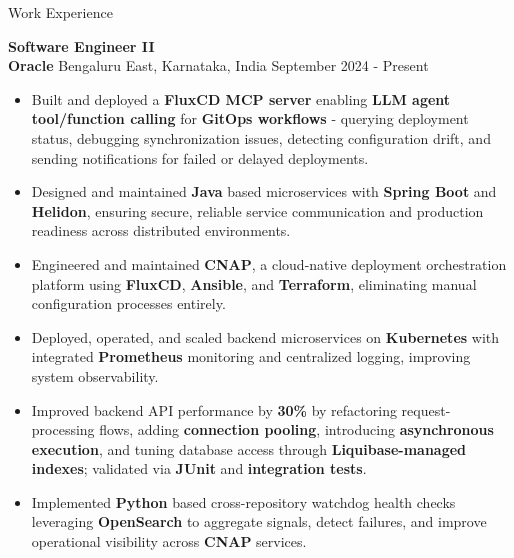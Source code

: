 \documentclass{resume}
\begin{document}
\begin{rSection}{Work Experience}

\textbf{Software Engineer II} \\
\textbf{Oracle} \textbar{} Bengaluru East, Karnataka, India \hspace*{\fill} September 2024 - Present
\vspace{-2pt}
\begin{itemize}
    \item Built and deployed a \textbf{FluxCD MCP server} enabling \textbf{LLM agent tool/function calling} for \textbf{GitOps workflows} - querying deployment status, debugging synchronization issues, detecting configuration drift, and sending notifications for failed or delayed deployments.
    \item Designed and maintained \textbf{Java} based microservices with \textbf{Spring Boot} and \textbf{Helidon}, ensuring secure, reliable service communication and production readiness across distributed environments.
    \item Engineered and maintained \textbf{CNAP}, a cloud-native deployment orchestration platform using \textbf{FluxCD}, \textbf{Ansible}, and \textbf{Terraform}, eliminating manual configuration processes entirely.
    \item Deployed, operated, and scaled backend microservices on \textbf{Kubernetes} with integrated \textbf{Prometheus} monitoring and centralized logging, improving system observability.
    \item Improved backend API performance by \textbf{30\%} by refactoring request-processing flows, adding \textbf{connection pooling}, introducing \textbf{asynchronous execution}, and tuning database access through \textbf{Liquibase-managed indexes}; validated via \textbf{JUnit} and \textbf{integration tests}.
    \item Implemented \textbf{Python} based cross-repository watchdog health checks leveraging \textbf{OpenSearch} to aggregate signals, detect failures, and improve operational visibility across \textbf{CNAP} services.
\end{itemize}


\end{rSection}
\end{document}
